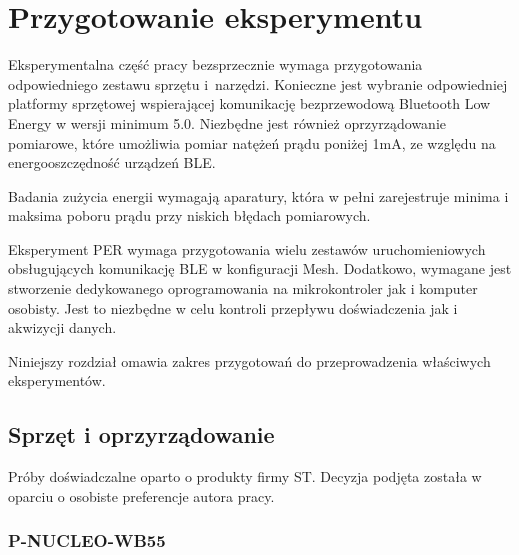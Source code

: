 \section{Przygotowanie eksperymentu}

Eksperymentalna część pracy bezsprzecznie wymaga przygotowania odpowiedniego zestawu
sprzętu i~narzędzi. Konieczne jest wybranie odpowiedniej platformy sprzętowej
wspierającej komunikację bezprzewodową Bluetooth Low Energy w wersji minimum 5.0.
Niezbędne jest również oprzyrządowanie pomiarowe, które umożliwia pomiar natężeń
prądu poniżej 1mA, ze względu na energooszczędność urządzeń \gls{BLE}.


Badania zużycia energii wymagają aparatury, która w pełni zarejestruje minima i maksima
poboru prądu przy niskich błędach pomiarowych.

Eksperyment \gls{PER} wymaga przygotowania wielu zestawów uruchomieniowych obsługujących
komunikację BLE w konfiguracji Mesh. Dodatkowo, wymagane jest stworzenie dedykowanego oprogramowania
na mikrokontroler jak i komputer osobisty. Jest to niezbędne w celu kontroli przepływu
doświadczenia jak i akwizycji danych.

Niniejszy rozdział omawia zakres przygotowań do przeprowadzenia właściwych eksperymentów.


\subsection{Sprzęt i oprzyrządowanie}

Próby doświadczalne oparto o produkty firmy ST. Decyzja podjęta została w oparciu
o osobiste preferencje autora pracy.

\subsubsection{P-NUCLEO-WB55}

